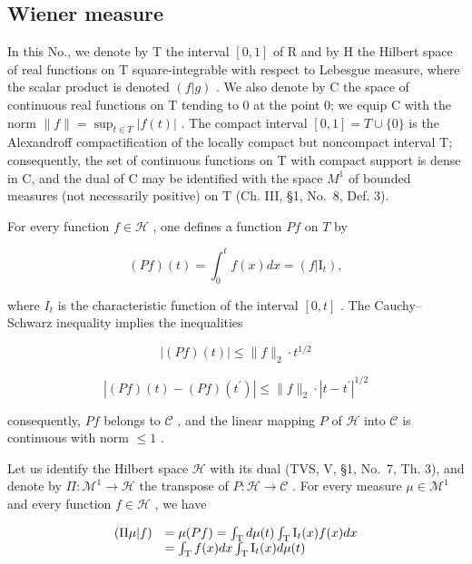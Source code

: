 \subsection{Wiener measure}

In this No., we denote by T the interval \([0,1]\) of R and by H the Hilbert space of real functions on T square-integrable with respect to Lebesgue measure, where the scalar product is denoted \((f|g)\) . We also denote by C the space of continuous real functions on T tending to 0 at the point 0; we equip C with the norm \(\|f\| = \sup_{t \in T} |f(t)|\) . The compact interval \([0,1] = T \cup \{0\}\) is the Alexandroff compactification of the locally compact but noncompact interval T; consequently, the set of continuous functions on T with compact support is dense in C, and the dual of C may be identified with the space \(M^{1}\) of bounded measures (not necessarily positive) on T (Ch. III, §1, No.~8, Def. 3).

For every function \(f \in \mathcal{H}\) , one defines a function \(Pf\) on \(T\) by

\[
(P f) (t) = \int_ {0} ^ {t} f (x) d x = (f | \mathrm{I} _ {t}),\tag{31}
\]

where \(I_{t}\) is the characteristic function of the interval \([0, t]\) . The Cauchy--Schwarz inequality implies the inequalities

\[
| (P f) (t) | \leqslant \| f \| _ {2} \cdot t ^ {1 / 2}\tag{32}
\]

\[
\left| (P f) (t) - (P f) \left(t ^ {\prime}\right) \right| \leqslant \| f \| _ {2} \cdot \left| t - t ^ {\prime} \right| ^ {1 / 2}\tag{33}
\]

consequently, \(Pf\) belongs to \(\mathcal{C}\) , and the linear mapping \(P\) of \(\mathcal{H}\) into \(\mathcal{C}\) is continuous with norm \(\leqslant 1\) .

Let us identify the Hilbert space \(\mathcal{H}\) with its dual (TVS, V, §1, No.~7, Th. 3), and denote by \(\Pi : \mathcal{M}^1 \to \mathcal{H}\) the transpose of \(P: \mathcal{H} \to \mathcal{C}\) . For every measure \(\mu \in \mathcal{M}^1\) and every function \(f \in \mathcal{H}\) , we have

\[
\begin{array}{r l} (\Pi \mu | f) & = \mu (P f) = \int_ {\mathrm{T}} d \mu (t) \int_ {\mathrm{T}} \mathrm{I} _ {t} (x) f (x) d x \\ & = \int_ {\mathrm{T}} f (x) d x \int_ {\mathrm{T}} \mathrm{I} _ {t} (x) d \mu (t) \end{array}
\]

